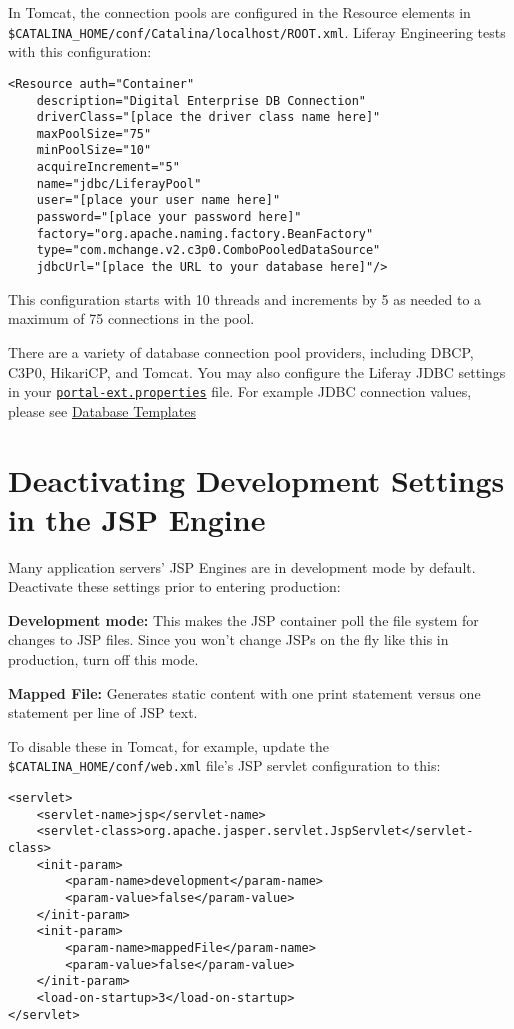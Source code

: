 In Tomcat, the connection pools are configured in the Resource elements
in \texttt{\$CATALINA\_HOME/conf/Catalina/localhost/ROOT.xml}. Liferay
Engineering tests with this configuration:

\begin{verbatim}
<Resource auth="Container"         
    description="Digital Enterprise DB Connection"   
    driverClass="[place the driver class name here]"   
    maxPoolSize="75"   
    minPoolSize="10"           
    acquireIncrement="5"   
    name="jdbc/LiferayPool"  
    user="[place your user name here]"   
    password="[place your password here]"           
    factory="org.apache.naming.factory.BeanFactory"
    type="com.mchange.v2.c3p0.ComboPooledDataSource"
    jdbcUrl="[place the URL to your database here]"/>
\end{verbatim}

This configuration starts with 10 threads and increments by 5 as needed
to a maximum of 75 connections in the pool.

There are a variety of database connection pool providers, including
DBCP, C3P0, HikariCP, and Tomcat. You may also configure the Liferay
JDBC settings in your
\href{https://docs.liferay.com/ce/portal/7.2-latest/propertiesdoc/portal.properties.html}{\texttt{portal-ext.properties}}
file. For example JDBC connection values, please see
\href{/docs/7-2/deploy/-/knowledge_base/d/database-templates}{Database
Templates}

\section{Deactivating Development Settings in the JSP
Engine}\label{deactivating-development-settings-in-the-jsp-engine}

Many application servers' JSP Engines are in development mode by
default. Deactivate these settings prior to entering production:

\textbf{Development mode:} This makes the JSP container poll the file
system for changes to JSP files. Since you won't change JSPs on the fly
like this in production, turn off this mode.

\textbf{Mapped File:} Generates static content with one print statement
versus one statement per line of JSP text.

To disable these in Tomcat, for example, update the
\texttt{\$CATALINA\_HOME/conf/web.xml} file's JSP servlet configuration
to this:

\begin{verbatim}
<servlet>   
    <servlet-name>jsp</servlet-name>
    <servlet-class>org.apache.jasper.servlet.JspServlet</servlet-class>   
    <init-param>    
        <param-name>development</param-name>    
        <param-value>false</param-value>   
    </init-param>   
    <init-param>    
        <param-name>mappedFile</param-name>    
        <param-value>false</param-value>   
    </init-param>   
    <load-on-startup>3</load-on-startup>
</servlet>
\end{verbatim}

